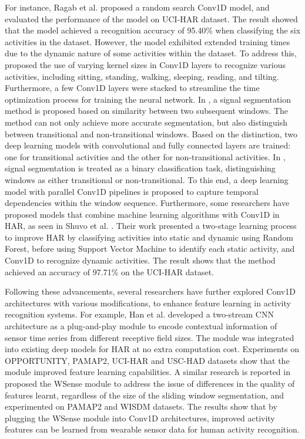 \documentclass[preprint,12pt]{elsarticle}
\begin{document}
For instance, Ragab et al. \citep{ragab2020random} proposed a random search Conv1D model, and evaluated the performance of the model on UCI-HAR dataset. The result showed that the model achieved a recognition accuracy of 95.40\% when classifying the six activities in the dataset. However, the model exhibited extended training times due to the dynamic nature of some activities within the dataset. To address this, \citep{banjarey2022human} proposed the use of varying kernel sizes in Conv1D layers to recognize various activities, including sitting, standing, walking, sleeping, reading, and tilting. Furthermore, a few Conv1D layers were stacked to streamline the time optimization process for training the neural network. In \citep{baraka_similarity_2023}, a signal segmentation method is proposed based on similarity between two subsequent windows. The method can not only achieve more accurate segmentation, but also distinguish between transitional and non-transitional windows. Based on the distinction, two deep learning models with convolutional and fully connected layers are trained: one for transitional activities and the other for non-transitional activities. In \citep{baraka_deep_2024}, signal segmentation is treated as a binary classification task, distinguishing windows as either transitional or non-transitional. To this end, a deep learning model with parallel Conv1D pipelines is proposed to capture temporal dependencies within the window sequence. Furthermore, some researchers have proposed models that combine machine learning algorithms with Conv1D in HAR, as seen in Shuvo et al. \citep{shuvo2020hybrid}. Their work presented a two-stage learning process to improve HAR by classifying activities into static and dynamic using Random Forest, before using Support Vector Machine to identify each static activity, and Conv1D to recognize dynamic activities. The result shows that the method achieved an accuracy of 97.71\% on the UCI-HAR dataset.

Following these advancements, several researchers have further explored Conv1D architectures with various modifications, to enhance feature learning in activity recognition systems. For example, Han et al. \citep{han2022human} developed a two-stream CNN architecture as a plug-and-play module to encode contextual information of sensor time series from different receptive field sizes. The module was integrated into existing deep models for HAR at no extra computation cost. Experiments on OPPORTUNITY, PAMAP2, UCI-HAR and USC-HAD datasets show that the module improved feature learning capabilities. A similar research is reported in \citep{ige2023wsense} proposed the WSense module to address the issue of differences in the quality of features learnt, regardless of the size of the sliding window segmentation, and experimented on PAMAP2 and WISDM datasets. The results show that by plugging the WSense module into Conv1D architectures, improved activity features can be learned from wearable sensor data for human activity recognition.
\end{document}
